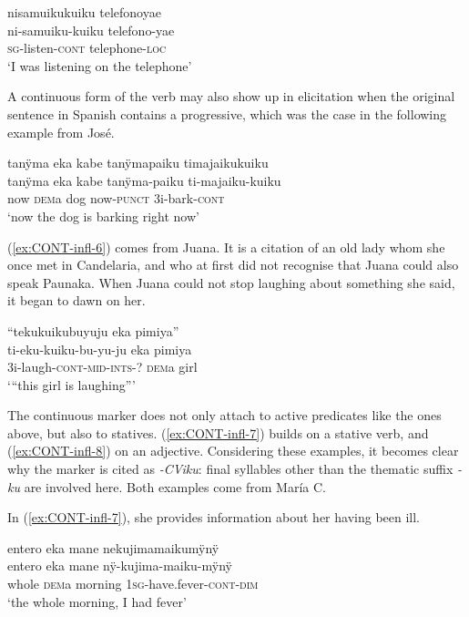 \ea\label{ex:CONT-infl-4}
\begingl
\glpreamble nisamuikukuiku telefonoyae\\
\gla ni-samuiku-kuiku telefono-yae\\
\textsc{sg}-listen-\textsc{cont} telephone-\textsc{loc}\\
\glft ‘I was listening on the telephone’
\endgl
\trailingcitation{[jxx-p110923l-1.305]}
\xe

A continuous form of the verb may also show up in elicitation when the original sentence in Spanish contains a progressive, which was the case in the following example from José.

\ea\label{ex:CONT-infl-5}
\begingl
\glpreamble tanÿma eka kabe tanÿmapaiku timajaikukuiku\\
\gla tanÿma eka kabe tanÿma-paiku ti-majaiku-kuiku\\
\glb now \textsc{dem}a dog now-\textsc{punct} 3i-bark-\textsc{cont}\\
\glft ‘now the dog is barking right now’
\endgl
\trailingcitation{[mox-a110920l-1]}
\xe

(\ref{ex:CONT-infl-6}) comes from Juana. It is a citation of an old lady whom she once met in Candelaria, and who at first did not recognise that Juana could also speak Paunaka. When Juana could not stop laughing about something she said, it began to dawn on her.

\ea\label{ex:CONT-infl-6}
\begingl
\glpreamble “tekukuikubuyuju eka pimiya”\\
\gla ti-eku-kuiku-bu-yu-ju eka pimiya\\
\glb 3i-laugh-\textsc{cont}-\textsc{mid}-\textsc{ints}-? \textsc{dem}a girl\\
\glft ‘“this girl is laughing”’
\endgl
\trailingcitation{[jxx-p120515l-1.085]}
\xe

The continuous marker does not only attach to active predicates like the ones above, but also to statives. (\ref{ex:CONT-infl-7}) builds on a stative verb,  and (\ref{ex:CONT-infl-8}) on an adjective. Considering these examples, it becomes clear why the marker is cited as \textit{-CViku}: final syllables other than the thematic suffix \textit{-ku} are involved here. Both examples come from María C.

In (\ref{ex:CONT-infl-7}), she provides information about her having been ill.

\ea\label{ex:CONT-infl-7}
\begingl
\glpreamble entero eka mane nekujimamaikumÿnÿ\\
\gla entero eka mane nÿ-kujima-maiku-mÿnÿ\\
\glb whole \textsc{dem}a morning 1\textsc{sg}-have.fever-\textsc{cont}-\textsc{dim}\\
\glft ‘the whole morning, I had fever’
\endgl
\trailingcitation{[ump-p110815sf.716]}
\xe

